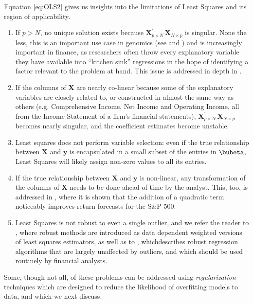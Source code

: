 \documentclass[graybox,envcountchap,sectrefs]{svmono}\usepackage[]{graphicx}\usepackage[]{xcolor}
\begin{document}
\begin{appendices}
Equation \eqref{eq:OLS2} gives us insights into the limitations of
Least Squares and its region of applicability.
\begin{enumerate}
\item If $p>N$, no unique solution exists because $\mathrm{\mathbf{X}}_{p\times N}^{\prime}\,\mathrm{\mathbf{X}}_{N\times p}$
is singular. None the less, this is an important use case in genomics
(see \citet{JohnstoneTitterington2009} and \citet{FanMaZhong2021})
and is increasingly important in finance, as researchers often throw
every explanatory variable they have available into ``kitchen sink''
regressions in the hope of identifying a factor relevant to the problem
at hand. This issue is addressed in depth in \ExpectedReturnChapter.
\item If the columns of $\mathbf{X}$ are nearly co-linear because some
of the explanatory variables are closely related to, or constructed
in almost the same way as others (e.g. Comprehensive Income, Net Income
and Operating Income, all from the Income Statement of a firm's financial
statements), $\mathrm{\mathbf{X}}_{p\times N}^{\prime}\,\mathrm{\mathbf{X}}_{N\times p}$
becomes nearly singular, and the coefficient estimates become unstable.
\item Least squares does not perform variable selection: even if the true
relationship between $\mathrm{\mathbf{X}}$ and $\mathrm{\mathbf{y}}$
is encapsulated in a small subset of the entries in $\mathrm{\bubeta}$,
Least Squares will likely assign non-zero values to all its entries. 
\item If the true relationship between $\mathrm{\mathbf{X}}$ and $\mathrm{\mathbf{y}}$
is non-linear, any transformation of the columns of $\mathrm{\mathbf{X}}$
needs to be done ahead of time by the analyst. This, too, is addressed
in \ExpectedReturnChapter, where it is shown that the addition of
a quadratic term noticeably improves return forecasts for the S\&P
500.
\item Least Squares is not robust to even a single outlier, and we refer
the reader to \RobustEstimationSections, where robust methods are
introduced as data dependent weighted versions of least squares estimators,
as well as to \RobustEstimatorsChapter, whichdescribes robust regression
algorithms that are largely unaffected by outliers, and which should
be used routinely by financial analysts.
\end{enumerate}
Some, though not all, of these problems can be addressed using \emph{regularization}
techniques which are designed to reduce the likelihood of overfitting
models to data, and which we next discuss.



\end{appendices}
\end{document}
